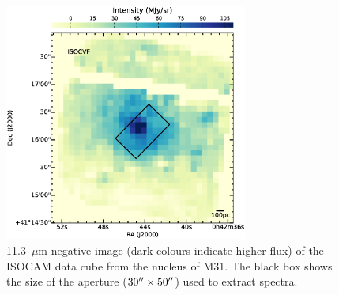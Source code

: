 \begin{figure}
\centering
\includegraphics[width = 8cm]{./isonuc.eps}
\caption{11.3~$\mu$m negative image (dark colours indicate higher flux) of the ISOCAM data cube from the nucleus of M31. 
The black box shows the size of the aperture ($30\hbox{$^{\prime\prime}$}\times50\hbox{$^{\prime\prime}$}$) used to extract spectra.}
\label{isonuc}
\end{figure}





